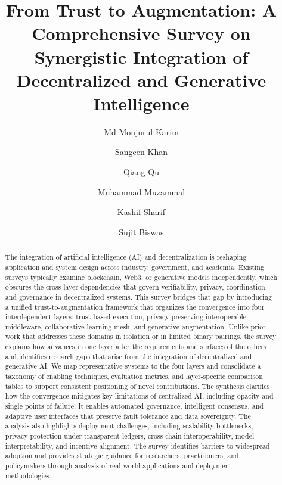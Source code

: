 \documentclass[5p,twocolumn]{elsarticle}
\begin{document}
\begin{frontmatter}	

\title{From Trust to Augmentation: A Comprehensive Survey on Synergistic Integration of Decentralized and Generative Intelligence}

\author[add1]{Md Monjurul Karim}
\author[add1,add2]{Sangeen Khan}
\author[add1]{Qiang Qu}
\author[add3]{Muhammad Muzammal}
\author[add4]{Kashif Sharif}
\author[add5]{Sujit Biswas}

\address[add1]{Shenzhen Institutes of Advanced Technology, Chinese Academy of Sciences, Shenzhen 518055, China}
\address[add2]{University of Chinese Academy of Sciences, Beijing 100049, China}
\address[add3]{Department of Computer and Information Sciences, Northumbria University, Newcastle NE7 7XA, United Kingdom}
\address[add4]{School of Computer Science and Technology, Beijing Institute of Technology, Beijing 100081, China}
\address[add5]{School of Science and Technology, City St George's, University of London, London EC1V0HB, United Kingdom}


\begin{abstract}
The integration of artificial intelligence (AI) and decentralization is reshaping application and system design across industry, government, and academia. Existing surveys typically examine blockchain, Web3, or generative models independently, which obscures the cross-layer dependencies that govern verifiability, privacy, coordination, and governance in decentralized systems. This survey bridges that gap by introducing a unified trust-to-augmentation framework that organizes the convergence into four interdependent layers: trust-based execution, privacy-preserving interoperable middleware, collaborative learning mesh, and generative augmentation. Unlike prior work that addresses these domains in isolation or in limited binary pairings, the survey explains how advances in one layer alter the requirements and surfaces of the others and identifies research gaps that arise from the integration of decentralized and generative AI. We map representative systems to the four layers and consolidate a taxonomy of enabling techniques, evaluation metrics, and layer-specific comparison tables to support consistent positioning of novel contributions. The synthesis clarifies how the convergence mitigates key limitations of centralized AI, including opacity and single points of failure. It enables automated governance, intelligent consensus, and adaptive user interfaces that preserve fault tolerance and data sovereignty. The analysis also highlights deployment challenges, including scalability bottlenecks, privacy protection under transparent ledgers, cross-chain interoperability, model interpretability, and incentive alignment. The survey identifies barriers to widespread adoption and provides strategic guidance for researchers, practitioners, and policymakers through analysis of real-world applications and deployment methodologies.
\end{abstract}


\end{frontmatter}
\end{document}
